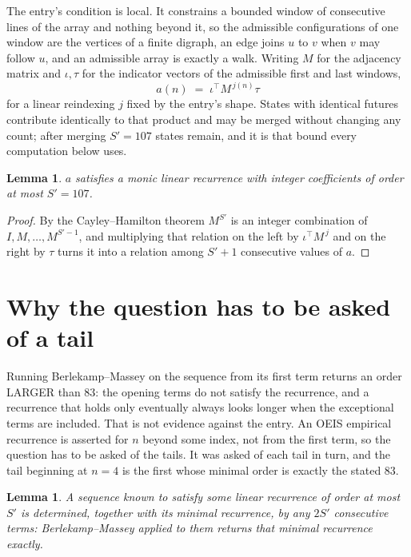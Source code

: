 \documentclass[11pt,a4paper]{article}
\theoremstyle{plain}
\newtheorem{lemma}[theorem]{Lemma}
\theoremstyle{definition}
\begin{document}
The entry's condition is local. It constrains a bounded window of consecutive lines of the
array and nothing beyond it, so the admissible configurations of one window are the vertices of
a finite digraph, an edge joins $u$ to $v$ when $v$ may follow $u$, and an admissible array is
exactly a walk. Writing $M$ for the adjacency matrix and $\iota,\tau$ for the indicator vectors
of the admissible first and last windows,
\[
a(n)\;=\;\iota^{\!\top}M^{\,j(n)}\tau
\]
for a linear reindexing $j$ fixed by the entry's shape. States with identical futures
contribute identically to that product and may be merged without changing any count; after
merging $S'=107$ states remain, and it is that bound every computation below uses.

\begin{lemma}\label{lem:cf}
$a$ satisfies a monic linear recurrence with integer coefficients of order at most $S'=107$.
\end{lemma}

\begin{proof}
By the Cayley--Hamilton theorem $M^{S'}$ is an integer combination of $I,M,\dots,M^{S'-1}$,
and multiplying that relation on the left by $\iota^{\!\top}M^{\,j}$ and on the right by
$\tau$ turns it into a relation among $S'+1$ consecutive values of $a$.
\end{proof}

\section{Why the question has to be asked of a tail}

Running Berlekamp--Massey on the sequence from its first term returns an order LARGER than $83$: the opening terms do not satisfy the recurrence, and a recurrence that holds only eventually always looks longer when the exceptional terms are included. That is not evidence against the entry. An OEIS empirical recurrence is asserted for $n$ beyond some index, not from the first term, so the question has to be asked of the tails. It was asked of each tail in turn, and the tail beginning at $n=4$ is the first whose minimal order is exactly the stated $83$.

\begin{lemma}\label{lem:bm}
A sequence known to satisfy some linear recurrence of order at most $S'$ is determined,
together with its minimal recurrence, by any $2S'$ consecutive terms: Berlekamp--Massey applied
to them returns that minimal recurrence exactly.
\end{lemma}
\end{document}
